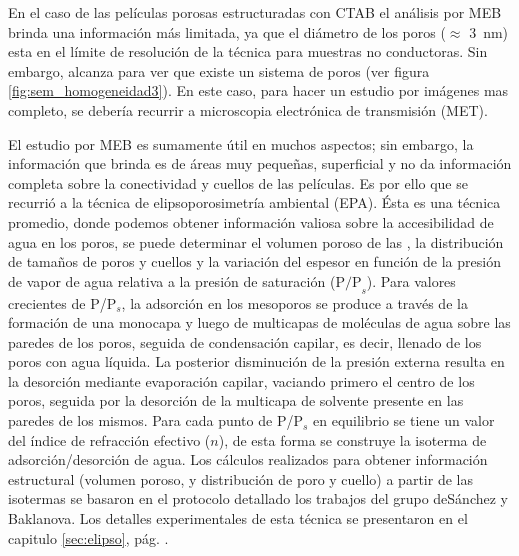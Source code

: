 		 En el caso de las películas porosas estructuradas con CTAB el análisis por MEB brinda una información más limitada, ya que el diámetro de los poros ($\approx$ \SI{3}{\nm}) esta en el límite de resolución de la técnica para muestras no conductoras. Sin embargo, alcanza para  ver que existe un sistema de poros (ver figura \ref{fig:sem_homogeneidad3}). En este caso, para hacer un estudio por imágenes mas completo, se debería recurrir a microscopia electrónica de transmisión (MET).

		 El estudio por MEB es sumamente útil en muchos aspectos; sin embargo, la información que brinda es de áreas muy pequeñas, superficial y no da información completa sobre la conectividad y cuellos de las películas. Es por ello que se recurrió a la técnica de elipsoporosimetría ambiental (EPA). Ésta es una técnica promedio, donde podemos obtener información valiosa sobre la accesibilidad de agua en los poros, se puede determinar el volumen poroso de las \pdm, la distribución de tamaños de poros y cuellos y la variación del espesor en función de la presión de vapor de agua relativa a la presión de saturación ($\text{P/P}_s$). Para valores crecientes de P/P$_s$, la adsorción en los mesoporos se produce a través de la formación de una monocapa y luego de multicapas de moléculas de agua sobre las paredes de los poros, seguida de condensación capilar, es decir, llenado de los poros con agua líquida. La posterior disminución de la presión externa resulta en la desorción mediante evaporación capilar, vaciando primero el centro de los poros, seguida por la desorción de la multicapa de solvente presente en las paredes de los mismos. Para cada punto de P/P$_s$ en equilibrio se tiene un valor del índice de refracción efectivo ($n$), de esta forma se construye la isoterma de adsorción/desorción de agua. Los cálculos realizados para obtener información estructural (volumen poroso, y distribución de poro y cuello) a partir de las isotermas se basaron en el protocolo detallado los trabajos del grupo deSánchez y Baklanova\cite{Baklanov2000,Boissiere2005,Sakatani2006}. Los detalles experimentales de esta técnica se presentaron en el capitulo \ref{sec:elipso}, pág. \pageref{sec:elipso}.

